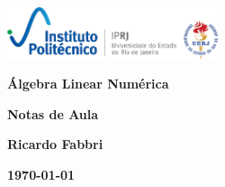 \begin{titlepage}
\begin{center}


\includegraphics[height=1.5cm]{figs/iprj-heading-v1.png}
  \vspace{2cm}





\begin{center}
  {\huge \textbf {Álgebra Linear Numérica }}
  \vskip1cm 
 
\end{center}

  \vspace{0.6cm}
  {\LARGE \textbf{Notas de Aula}}

\vspace{10 cm} %

\begin{center}
\textbf{Ricardo Fabbri}
\end{center}


 \begin{center}
  \vspace{0.5 cm}
 
 {\large \textbf{\today}}%
\end{center}
\end{center}
\end{titlepage}
\thispagestyle{empty}
\frontmatter
